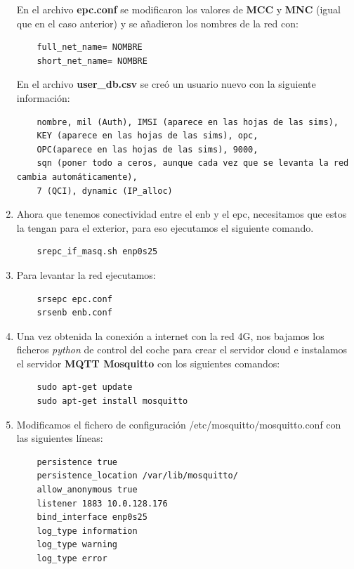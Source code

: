 \begin{enumerate}
En el archivo \textbf{epc.conf} se modificaron los valores de \textbf{MCC} y \textbf{MNC} (igual que en el caso anterior) y se añadieron los nombres de la red con:
\begin{lstlisting}
    full_net_name= NOMBRE
    short_net_name= NOMBRE
\end{lstlisting}

En el archivo \textbf{user_db.csv} se creó un usuario nuevo con la siguiente información:
\begin{lstlisting}
    nombre, mil (Auth), IMSI (aparece en las hojas de las sims),
    KEY (aparece en las hojas de las sims), opc,
    OPC(aparece en las hojas de las sims), 9000,
    sqn (poner todo a ceros, aunque cada vez que se levanta la red cambia automáticamente),
    7 (QCI), dynamic (IP_alloc)
\end{lstlisting}

\item Ahora que tenemos conectividad entre el enb y el epc, necesitamos que estos la tengan para el exterior, para eso ejecutamos el siguiente comando.

\begin{lstlisting}
    srepc_if_masq.sh enp0s25
\end{lstlisting}

\item Para levantar la red ejecutamos:
\begin{lstlisting}
    srsepc epc.conf
    srsenb enb.conf
\end{lstlisting}

\item Una vez obtenida la conexión a internet con la red 4G, nos bajamos los ficheros \textit{python} de control del coche para crear el servidor cloud e instalamos el servidor \textbf{MQTT Mosquitto} con los siguientes comandos:

\begin{lstlisting}
	sudo apt-get update
	sudo apt-get install mosquitto
\end{lstlisting}

\item Modificamos el fichero de configuración /etc/mosquitto/mosquitto.conf con las siguientes líneas:
\begin{lstlisting}
	persistence true
	persistence_location /var/lib/mosquitto/
	allow_anonymous true
	listener 1883 10.0.128.176
	bind_interface enp0s25
	log_type information
	log_type warning
	log_type error
\end{lstlisting}


\end{enumerate}
